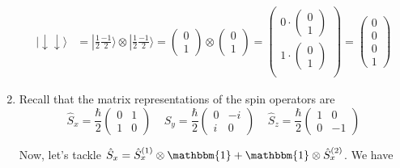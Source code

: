 \documentclass{article}
\newcommand{\ket}[1]{|#1 \rangle}
\begin{document}
\begin{enumerate}[label=(\alph*)]
  \vskip 0.25cm
  \begin{align*}
    \ket{\downarrow \downarrow} &= \ket{\frac{1}{2} \frac{-1}{2}} \otimes \ket{\frac{1}{2} \frac{-1}{2}} 
    = \begin{pmatrix}
      0 \\ 1
    \end{pmatrix} \otimes \begin{pmatrix}
      0 \\ 1
    \end{pmatrix} 
    = \begin{pmatrix}
      0 \cdot \begin{pmatrix}
        0 \\ 1
      \end{pmatrix} \\
      1 \cdot \begin{pmatrix}
        0 \\ 1
      \end{pmatrix} \\
    \end{pmatrix} 
    = \begin{pmatrix}
      0 \\ 0 \\ 0 \\ 1
    \end{pmatrix}
  \end{align*}

  \vskip 0.5cm
  \item Recall that the matrix representations of the spin operators are 
  \[  \hat{S}_x = \frac{\hbar}{2} \begin{pmatrix}
    0 & 1 \\
    1 & 0
  \end{pmatrix} \;\;\;\; 
  \hat{S}_y = \frac{\hbar}{2} \begin{pmatrix}
    0 & -i \\
    i & 0
  \end{pmatrix} \;\;\;\; 
  \hat{S}_z = \frac{\hbar}{2} \begin{pmatrix}
    1 & 0 \\
    0 & -1
  \end{pmatrix} \]
  
  \vskip 0.25cm
  Now, let's tackle $\hat{S}_x = \hat{S}_x^{(1)} \otimes \mathbbm{1} + \mathbbm{1} \otimes \hat{S}_x^{(2)}$. We have 


\end{enumerate}
\end{document}
